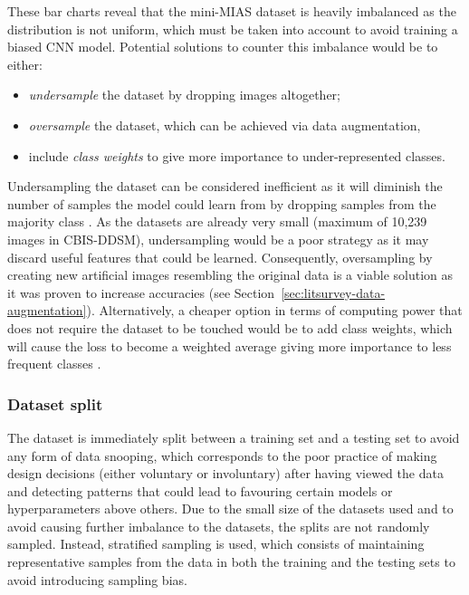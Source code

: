 These bar charts reveal that the mini-MIAS dataset is heavily imbalanced as the distribution is not uniform, which must be taken into account to avoid training a biased CNN model. Potential solutions to counter this imbalance would be to either:
\begin{itemize}
    \item \textit{undersample} the dataset by dropping images altogether;
    \item \textit{oversample} the dataset, which can be achieved via data augmentation,
    \item include \textit{class weights} to give more importance to under-represented classes. 
\end{itemize}

Undersampling the dataset can be considered inefficient as it will diminish the number of samples the model could learn from by dropping samples from the majority class \citep{Liu2009}. As the datasets are already very small (maximum of 10,239 images in CBIS-DDSM), undersampling would be a poor strategy as it may discard useful features that could be learned. Consequently, oversampling by creating new artificial images resembling the original data is a viable solution as it was proven to increase accuracies (see Section~\ref{sec:litsurvey-data-augmentation}). Alternatively, a cheaper option in terms of computing power that does not require the dataset to be touched would be to add class weights, which will cause the loss to become a weighted average giving more importance to less frequent classes \citep{Zhu2018}.

\subsubsection{Dataset split}

The dataset is immediately split between a training set and a testing set to avoid any form of data snooping, which corresponds to the poor practice of making design decisions (either voluntary or involuntary) after having viewed the data and detecting patterns that could lead to favouring certain models or hyperparameters above others. Due to the small size of the datasets used and to avoid causing further imbalance to the datasets, the splits are not randomly sampled. Instead, stratified sampling is used, which consists of maintaining representative samples from the data in both the training and the testing sets to avoid introducing sampling bias.\\

